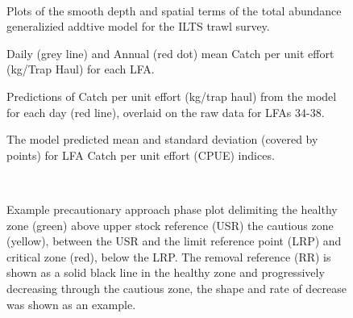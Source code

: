 \documentclass[11pt]{article}
\newcommand{\e}{\string~/bio.data/bio.lobster/figures/LFA3438Framework2019/figures/} %
\begin{document}
 \begin{figure}
    \centering
        \\
        \caption{Plots of the smooth depth and spatial terms of the total abundance generalizied addtive model for the ILTS trawl survey.}

    \end{figure}



  \begin{figure}
    \centering
        \caption{Daily (grey line) and Annual (red dot) mean Catch per unit effort (kg/Trap Haul) for each LFA.}

    \end{figure}



    \begin{figure}
    \centering
        \caption{Predictions of Catch per unit effort (kg/trap haul) from the model for each day (red line), overlaid on the raw data for LFAs 34-38. }

    \end{figure}

    \begin{figure}
    \centering
            \caption{The model predicted mean and standard deviation (covered by points) for LFA Catch per unit effort (CPUE) indices. }

  \end{figure}





\begin{figure}

   \\
                     \caption{Example precautionary approach phase plot delimiting the healthy zone (green) above upper stock reference (USR) the cautious zone (yellow), between the USR and the limit reference point (LRP) and critical zone (red), below the LRP. The removal reference (RR) is shown as a solid black line in the healthy zone and progressively decreasing through the cautious zone, the shape and rate of decrease was shown as an example.}
\end{figure}
\end{document}
